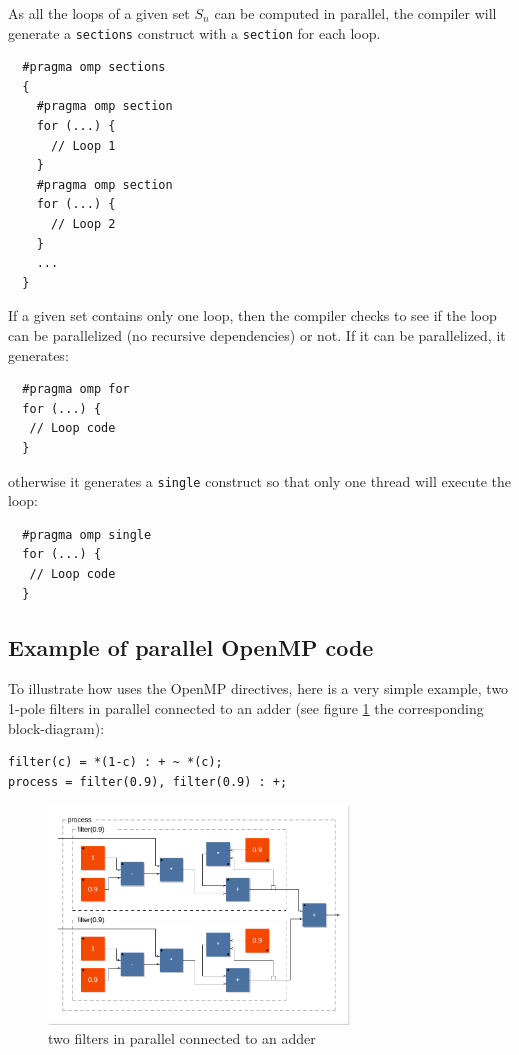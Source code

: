 \documentclass[a4paper,10pt]{book}
\begin{document}
As all the loops of a given set $S_n$ can be computed in parallel, the compiler will generate a \lstinline!sections! construct with a \lstinline!section! for each loop. 
\begin{lstlisting}
  #pragma omp sections
  {
    #pragma omp section
    for (...) {
      // Loop 1
    }
    #pragma omp section
    for (...) {
      // Loop 2
    }
    ...
  }
\end{lstlisting}
 
If a given set contains only one loop, then the compiler checks to see if the loop can be parallelized (no recursive dependencies) or not. If it can be parallelized, it generates:
\begin{lstlisting}
  #pragma omp for
  for (...) {
   // Loop code
  }
\end{lstlisting}
otherwise it generates a \lstinline!single! construct so that only one thread will execute the loop:
\begin{lstlisting}
  #pragma omp single
  for (...) {
   // Loop code
  }
\end{lstlisting}

\subsection{Example of parallel OpenMP code}
To illustrate how \faust uses the OpenMP directives, here is a very simple example, two 1-pole filters in parallel connected to an adder (see figure \ref{fig:parfilter} the corresponding block-diagram):

\begin{lstlisting}
filter(c) = *(1-c) : + ~ *(c);
process = filter(0.9), filter(0.9) : +; 
\end{lstlisting}

\begin{figure}[htb] 
  \centering
  \includegraphics[width=8cm]{images/filter2}
  \caption{two filters in parallel connected to an adder}   
  \label{fig:parfilter}
\end{figure}
\end{document}
